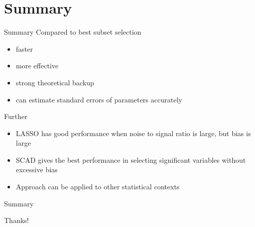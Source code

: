 \documentclass{beamer}
\begin{document}
\section{Summary}
    \begin{frame}{Summary}
    Compared to best subset selection
    \begin{itemize}
        \item faster
        \item more effective
        \item strong theoretical backup
        \item can estimate standard errors of parameters accurately
    \end{itemize}
    Further
    \begin{itemize}
        \item LASSO has good performance when noise to signal ratio is large, but bias is large
        \item SCAD gives the best performance in selecting significant variables without excessive bias
        \item Approach can be applied to other statistical contexts
    \end{itemize}
    
    \end{frame}
    \begin{frame}{Summary}
    \begin{center}
        {\Huge\calligra Thanks!}
    \end{center}
    \end{frame}
\end{document}
